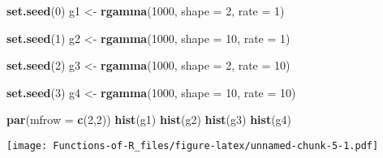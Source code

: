 \documentclass[
]{article}
\newenvironment{Shaded}{\begin{snugshade}}{\end{snugshade}}
\newcommand{\AttributeTok}[1]{\textcolor[rgb]{0.13,0.29,0.53}{#1}}
\newcommand{\DecValTok}[1]{\textcolor[rgb]{0.00,0.00,0.81}{#1}}
\newcommand{\FunctionTok}[1]{\textcolor[rgb]{0.13,0.29,0.53}{\textbf{#1}}}
\newcommand{\NormalTok}[1]{#1}
\newcommand{\OtherTok}[1]{\textcolor[rgb]{0.56,0.35,0.01}{#1}}
\begin{document}
\begin{Shaded}
\begin{Highlighting}[]
\FunctionTok{set.seed}\NormalTok{(}\DecValTok{0}\NormalTok{)}
\NormalTok{g1 }\OtherTok{\textless{}{-}} \FunctionTok{rgamma}\NormalTok{(}\DecValTok{1000}\NormalTok{, }\AttributeTok{shape =} \DecValTok{2}\NormalTok{, }\AttributeTok{rate =} \DecValTok{1}\NormalTok{)}

\FunctionTok{set.seed}\NormalTok{(}\DecValTok{1}\NormalTok{)}
\NormalTok{g2 }\OtherTok{\textless{}{-}} \FunctionTok{rgamma}\NormalTok{(}\DecValTok{1000}\NormalTok{, }\AttributeTok{shape =} \DecValTok{10}\NormalTok{, }\AttributeTok{rate =} \DecValTok{1}\NormalTok{)}

\FunctionTok{set.seed}\NormalTok{(}\DecValTok{2}\NormalTok{)}
\NormalTok{g3 }\OtherTok{\textless{}{-}} \FunctionTok{rgamma}\NormalTok{(}\DecValTok{1000}\NormalTok{, }\AttributeTok{shape =} \DecValTok{2}\NormalTok{, }\AttributeTok{rate =} \DecValTok{10}\NormalTok{)}

\FunctionTok{set.seed}\NormalTok{(}\DecValTok{3}\NormalTok{)}
\NormalTok{g4 }\OtherTok{\textless{}{-}} \FunctionTok{rgamma}\NormalTok{(}\DecValTok{1000}\NormalTok{, }\AttributeTok{shape =} \DecValTok{10}\NormalTok{, }\AttributeTok{rate =} \DecValTok{10}\NormalTok{)}

\FunctionTok{par}\NormalTok{(}\AttributeTok{mfrow =} \FunctionTok{c}\NormalTok{(}\DecValTok{2}\NormalTok{,}\DecValTok{2}\NormalTok{))}
\FunctionTok{hist}\NormalTok{(g1)}
\FunctionTok{hist}\NormalTok{(g2)}
\FunctionTok{hist}\NormalTok{(g3)}
\FunctionTok{hist}\NormalTok{(g4)}
\end{Highlighting}
\end{Shaded}

\texttt{[image: Functions-of-R\_files/figure-latex/unnamed-chunk-5-1.pdf]}
\end{document}
